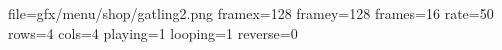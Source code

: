 file=gfx/menu/shop/gatling2.png
framex=128
framey=128
frames=16
rate=50
rows=4
cols=4
playing=1
looping=1
reverse=0
